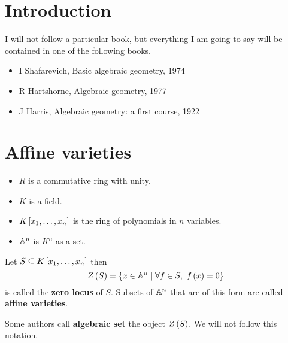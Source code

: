 \def\module{M4P33 Algebraic Geometry}
\def\lecturer{Dr Genival Da Silva Jr}
\def\term{Spring 2019}

\def\thm{section}







\section{Introduction}


I will not follow a particular book, but everything I am going to say will be contained in one of the following books.
\begin{itemize}
\item I Shafarevich, Basic algebraic geometry, 1974
\item R Hartshorne, Algebraic geometry, 1977
\item J Harris, Algebraic geometry: a first course, 1922
\end{itemize}

\pagebreak

\section{Affine varieties}

\begin{notation1}
\hfill
\begin{itemize}
\item $ R $ is a commutative ring with unity.
\item $ K $ is a field.
\item $ K\sb{x_1, \dots, x_n} $ is the ring of polynomials in $ n $ variables.
\item $ \A^n $ is $ K^n $ as a set.
\end{itemize}
\end{notation1}

\begin{definition}
Let $ S \subseteq K\sb{x_1, \dots, x_n} $ then
$$ Z\rb{S} = \cb{x \in \A^n \mid \forall f \in S, \ f\rb{x} = 0} $$
is called the \textbf{zero locus} of $ S $. Subsets of $ \A^n $ that are of this form are called \textbf{affine varieties}.
\end{definition}

\begin{remark1}
Some authors call \textbf{algebraic set} the object $ Z\rb{S} $. We will not follow this notation.
\end{remark1}

